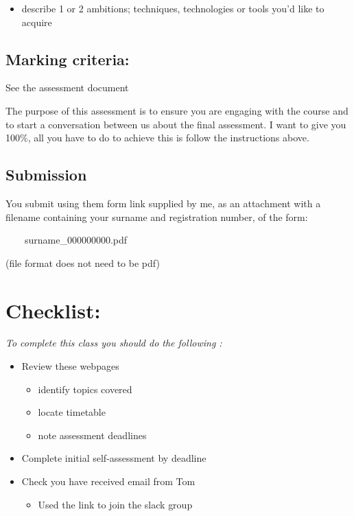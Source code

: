 \documentclass[
  12pt,
  a5paper,
]{book}
\providecommand{\tightlist}{%
  \setlength{\itemsep}{0pt}\setlength{\parskip}{0pt}}
\begin{document}
\begin{itemize}
\tightlist
\item
  describe 1 or 2 ambitions; techniques, technologies or tools you'd like to acquire
\end{itemize}

\hypertarget{marking-criteria}{%
\subsection{Marking criteria:}\label{marking-criteria}}

See the assessment document

The purpose of this assessment is to ensure you are engaging with the course and to start a conversation between us about the final assessment. I want to give you 100\%, all you have to do to achieve this is follow the instructions above.

\hypertarget{submission}{%
\subsection{Submission}\label{submission}}

You submit using them form link supplied by me, as an attachment with a filename containing your surname and registration number, of the form:

~~~~surname\_000000000.pdf

(file format does not need to be pdf)

\hypertarget{checklist}{%
\section{Checklist:}\label{checklist}}

\emph{To complete this class you should do the following :}

\begin{itemize}
\item
  Review these webpages

  \begin{itemize}
  \tightlist
  \item
    identify topics covered
  \item
    locate timetable
  \item
    note assessment deadlines
  \end{itemize}
\item
  Complete initial self-assessment by deadline
\item
  Check you have received email from Tom

  \begin{itemize}
  \tightlist
  \item
    Used the link to join the slack group
  \end{itemize}
\end{itemize}
\end{document}
